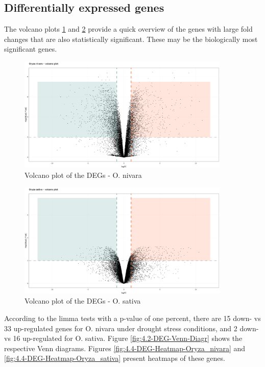 \subsection{Differentially expressed genes}

The volcano plots \ref{fig:4.1-DEG-Volcano-Plot-Oryza_nivara} and \ref{fig:4.1-DEG-Volcano-Plot-Oryza_sativa} provide a quick overview of the genes with large fold changes that are also statistically significant. These may be the biologically most significant genes.

\begin{figure}[htbp]
    \caption{Volcano plot of the DEGs - O. nivara}
    \label{fig:4.1-DEG-Volcano-Plot-Oryza_nivara}
    \includegraphics[width=0.9\textwidth]{../../results/plots-and-tables/4.1-DEG-Volcano-Plot-Oryza_nivara}
\end{figure}

\begin{figure}[htbp]
    \caption{Volcano plot of the DEGs - O. sativa}
    \label{fig:4.1-DEG-Volcano-Plot-Oryza_sativa}
    \includegraphics[width=0.9\textwidth]{../../results/plots-and-tables/4.1-DEG-Volcano-Plot-Oryza_sativa}
\end{figure}

According to the limma tests with a p-value of one percent, there are 15 down- vs 33 up-regulated genes for O. nivara under drought stress conditions, and 2 down- vs 16 up-regulated for O. sativa. Figure \ref{fig:4.2-DEG-Venn-Diagr} shows the respective Venn diagrams. Figures \ref{fig:4.4-DEG-Heatmap-Oryza_nivara} and \ref{fig:4.4-DEG-Heatmap-Oryza_sativa} present heatmaps of these genes.

